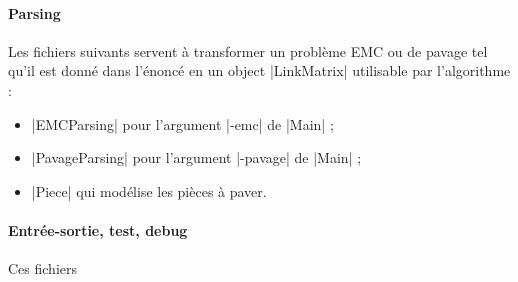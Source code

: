 \documentclass[11pt,french,a4paper]{article}
\begin{document}
\paragraph{Parsing} Les fichiers suivants servent à transformer un problème EMC ou de pavage tel qu'il est donné dans l'énoncé en un object |LinkMatrix| utilisable par l'algorithme :
\begin{itemize}
	\item |EMCParsing| pour l'argument |-emc| de |Main| ;
	\item |PavageParsing| pour l'argument |-pavage| de |Main| ;
	\item |Piece| qui modélise les pièces à paver. 
\end{itemize}

\paragraph{Entrée-sortie, test, debug} Ces fichiers 
\end{document}
